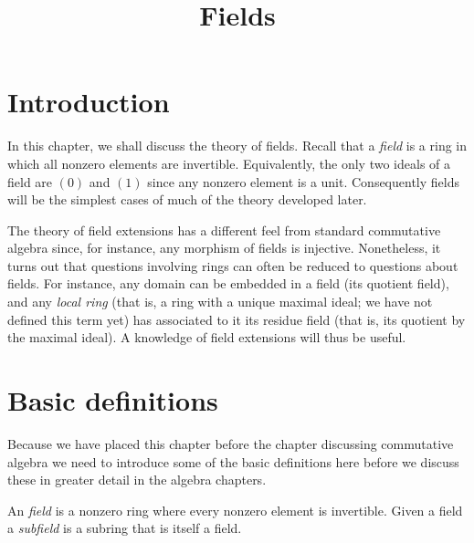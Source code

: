 

%


\title{Fields}


\maketitle

\label{section-phantom}

\tableofcontents


\section{Introduction}
\label{section-introduction}

\noindent
In this chapter, we shall discuss the theory of fields. Recall that a
{\it field} is a ring in which all nonzero elements are invertible.
Equivalently, the only two ideals of a field are $(0)$ and $(1)$
since any nonzero element is a unit. Consequently fields will be the
simplest cases of much of the theory developed later.

\medskip\noindent
The theory of field extensions has a different feel from standard commutative
algebra since, for instance, any morphism of fields is injective. Nonetheless,
it turns out that questions involving rings can often be reduced to questions
about fields. For instance, any domain can be embedded in a field
(its quotient field), and any {\it local ring} (that is, a ring with a unique
maximal ideal; we have not defined this term yet) has associated to it its
residue field (that is, its quotient by the maximal ideal).
A knowledge of field extensions will thus be useful.




\section{Basic definitions}
\label{section-definitions}

\noindent
Because we have placed this chapter before the chapter discussing
commutative algebra we need to introduce some of the basic definitions
here before we discuss these in greater detail in the algebra chapters.

\begin{definition}
\label{defition-field}
An {\it field} is a nonzero ring where every nonzero element is invertible.
Given a field a {\it subfield} is a subring that is itself a field.
\end{definition}

